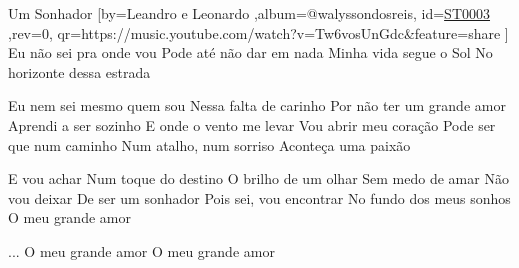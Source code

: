 \beginsong
{Um Sonhador %
}[by={Leandro e Leonardo %
},album={@walyssondosreis},
id={\href{https://music.youtube.com/watch?v=Tw6vosUnGdc&feature=share %
}{ST0003 %
}},rev={0}, %
qr={https://music.youtube.com/watch?v=Tw6vosUnGdc&feature=share %
}]
\beginverse
Eu não sei pra onde vou
Pode até não dar em nada
Minha vida segue o Sol
No horizonte dessa estrada
\endverse

\beginverse 
Eu nem sei mesmo quem sou
Nessa falta de carinho
Por não ter um grande amor
Aprendi a ser sozinho
\endverse
\beginverse 
E onde o vento me levar
Vou abrir meu coração
Pode ser que num caminho
Num atalho, num sorriso
Aconteça uma paixão
\endverse

\beginchorus
E vou achar
Num toque do destino
O brilho de um olhar
Sem medo de amar
Não vou deixar
De ser um sonhador
Pois sei, vou encontrar
No fundo dos meus sonhos
O meu grande amor
\endchorus

\beginverse 
... O meu grande amor
O meu grande amor
\endverse


